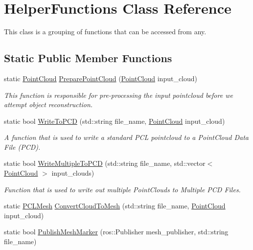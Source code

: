 \hypertarget{class_helper_functions}{\section{\-Helper\-Functions \-Class \-Reference}
\label{class_helper_functions}
}


\-This class is a grouping of functions that can be accessed from any.  


\subsection*{\-Static \-Public \-Member \-Functions}
\begin{DoxyCompactItemize}
\item 
static \hyperlink{_helper_functions_8h_abb956d1047f4dd2c956fe3cb0dd0004d}{\-Point\-Cloud} \hyperlink{class_helper_functions_a2e817646b20092d5f7179ba89635b50f}{\-Prepare\-Point\-Cloud} (\hyperlink{_helper_functions_8h_abb956d1047f4dd2c956fe3cb0dd0004d}{\-Point\-Cloud} input\-\_\-cloud)
\begin{DoxyCompactList}\small\item\em \-This function is responsible for pre-\/processing the input pointcloud before we attempt object reconstruction. \end{DoxyCompactList}\item 
static bool \hyperlink{class_helper_functions_a4b25abbfbd620e9218b2949c758a8872}{\-Write\-To\-P\-C\-D} (std\-::string file\-\_\-name, \hyperlink{_helper_functions_8h_abb956d1047f4dd2c956fe3cb0dd0004d}{\-Point\-Cloud} input\-\_\-cloud)
\begin{DoxyCompactList}\small\item\em \-A function that is used to write a standard \-P\-C\-L pointcloud to a \-Point\-Cloud \-Data \-File (\-P\-C\-D). \end{DoxyCompactList}\item 
static bool \hyperlink{class_helper_functions_a4428222439104c10e58e04958a231c37}{\-Write\-Multiple\-To\-P\-C\-D} (std\-::string file\-\_\-name, std\-::vector$<$ \hyperlink{_helper_functions_8h_abb956d1047f4dd2c956fe3cb0dd0004d}{\-Point\-Cloud} $>$ input\-\_\-clouds)
\begin{DoxyCompactList}\small\item\em \-Function that is used to write out multiple \-Point\-Clouds to \-Multiple \-P\-C\-D \-Files. \end{DoxyCompactList}\item 
static \hyperlink{_helper_functions_8h_a1ee4898d5040989c5fad6726ea5b2056}{\-P\-C\-L\-Mesh} \hyperlink{class_helper_functions_a51d22836259590b5e4e27c551bba93f3}{\-Convert\-Cloud\-To\-Mesh} (std\-::string file\-\_\-name, \hyperlink{_helper_functions_8h_abb956d1047f4dd2c956fe3cb0dd0004d}{\-Point\-Cloud} input\-\_\-cloud)
\item 
static bool \hyperlink{class_helper_functions_a5b355421138212e50b90b120734854ef}{\-Publish\-Mesh\-Marker} (ros\-::\-Publisher mesh\-\_\-publisher, std\-::string file\-\_\-name)
\end{DoxyCompactItemize}


